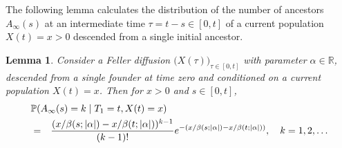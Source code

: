 \documentclass[preprint,12pt]{elsarticle}
\newtheorem{lemma}{Lemma}
\begin{document}
The following lemma calculates the distribution of the number of ancestors $A_\infty(s)$ at an intermediate time $\tau = t - s \in [0, t]$ of a current 
population $X(t) = x > 0$ descended from a single initial ancestor. 
\begin{lemma} \label{lemma:IntermediateAncestors}
Consider a Feller diffusion $\big(X(\tau)\big)_{\tau \in [0, t]}$ with parameter $\alpha \in \mathbb{R}$,  
descended from a single founder at time zero and conditioned on a current population $X(t) = x$. 
Then for $x > 0$ and $s \in [0, t]$, 
\begin{eqnarray}	\label{ancestorsGivenT1}
\lefteqn{\mathbb{P}(A_\infty(s) = k \mid T_1 = t, X(t) = x)} \nonumber \\
 	& = & \frac{(x/\beta(s; |\alpha|) - x/\beta(t; |\alpha|))^{k - 1}}{(k - 1)!} e^{-(x/\beta(s; |\alpha|) - x/\beta(t; |\alpha|))}, \quad k = 1, 2, \ldots
\end{eqnarray}
\end{lemma}
%
\end{document}
